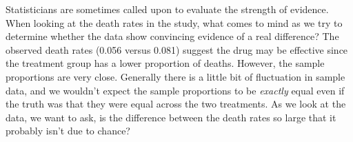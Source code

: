 \begin{example}{Statisticians are sometimes called upon to evaluate the strength of evidence. When looking at the death rates in the study, what comes to mind as we try to determine whether the data show convincing evidence of a real difference?} \label{sulphinpyrazoneResultsWhatIsConvincingEvidence}
The observed death rates (0.056 versus 0.081) suggest the drug may be effective since the treatment group has a lower proportion of deaths. However, the sample proportions are very close. Generally there is a little bit of fluctuation in sample data, and we wouldn't expect the sample proportions to be \emph{exactly} equal even if the truth was that they were equal across the two treatments. As we look at the data, we want to ask, is the difference between the death rates so large that it probably isn't due to chance?
\end{example}


